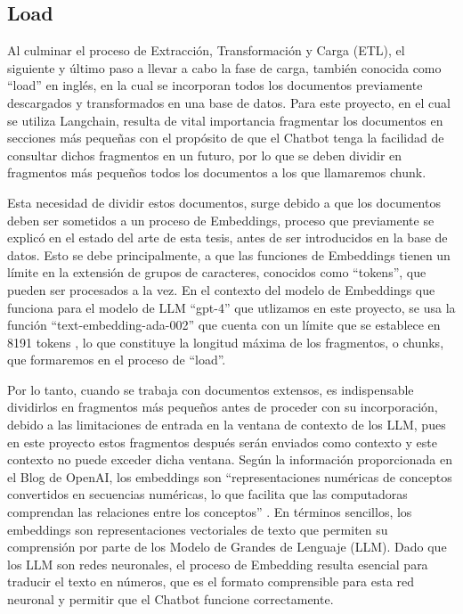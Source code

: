 \newpage

\subsection{Load}

\par Al culminar el proceso de Extracción, Transformación y Carga (ETL), el siguiente y último paso a llevar a cabo la fase de carga, 
también conocida como ``load'' en inglés, en la cual se incorporan todos los documentos previamente descargados y transformados 
en una base de datos. Para este proyecto, en el cual se utiliza Langchain, resulta de vital importancia fragmentar los documentos 
en secciones más pequeñas con el propósito de que el Chatbot tenga la facilidad de consultar dichos fragmentos en un futuro, por lo que se deben dividir en fragmentos
más pequeños todos los documentos a los que llamaremos chunk.

\par Esta necesidad de dividir estos documentos, surge debido a que los documentos deben ser sometidos a un proceso de Embeddings, proceso que
previamente se explicó en el estado del arte de esta tesis, antes de ser 
introducidos en la base de datos. Esto se debe principalmente, a que las funciones de Embeddings tienen un límite en la extensión 
de grupos de caracteres, conocidos como ``tokens'', que pueden ser procesados a la vez. En el contexto del modelo de Embeddings que funciona
para el modelo de LLM ``gpt-4'' que utlizamos en este proyecto, se usa la función
``text-embedding-ada-002'' que cuenta con un límite que se establece en 8191 tokens \cite{openai1}, lo que constituye la longitud máxima de los fragmentos, o chunks, que
formaremos en el proceso de ``load''.

\par Por lo tanto, cuando se trabaja con documentos extensos, es indispensable dividirlos en fragmentos más pequeños antes de proceder 
con su incorporación, debido a las limitaciones de entrada en la ventana de contexto de los LLM, pues en este proyecto estos fragmentos después serán enviados como contexto y este contexto no puede exceder dicha ventana. Según la información proporcionada en el Blog de OpenAI, los embeddings son ``representaciones numéricas 
de conceptos convertidos en secuencias numéricas, lo que facilita que las computadoras comprendan las relaciones entre los 
conceptos'' \cite{openai1}. En términos sencillos, los embeddings son representaciones vectoriales de texto que permiten su comprensión por 
parte de los Modelo de Grandes de Lenguaje (LLM). Dado que los LLM son redes neuronales, el proceso de Embedding resulta 
esencial para traducir el texto en números, que es el formato comprensible para esta red neuronal y permitir que el Chatbot funcione 
correctamente.


